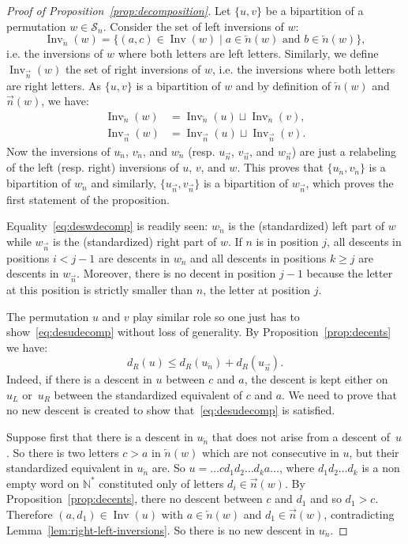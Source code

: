 \documentclass[ALCO,Unicode]{cedram}
\theoremstyle{definition}
\newcommand{\Sym}[1]{\mathcal{S}_{#1}}
\newcommand{\Symn}{\Sym{n}}
\DeclareMathOperator{\invs}{Inv}
\newcommand{\R}{{\overrightarrow{n}}}
\newcommand{\LL}{{\overleftarrow{n}}}
\newcommand{\dd}{d_R}
\begin{document}
\begin{proof}[Proof of Proposition~\ref{prop:decomposition}]
Let $\lbrace u, v \rbrace$ be a bipartition of a permutation $w \in \Symn$. Consider the set of left inversions of $w$:
$$
\invs_\LL(w)= \lbrace (a,c) \in \invs(w)\mid a \in \LL(w) \text{ and } b \in \LL(w) \rbrace,
$$
i.e. the inversions of $w$ where both letters are left letters. Similarly, we define $\invs_\R(w)$ the set of right inversions of $w$, i.e. the inversions where both letters are right letters. As $\lbrace u, v \rbrace$ is a bipartition of $w$ and by definition of  $\LL(w)$ and $\R(w)$, we have:
\begin{align*}
\invs_\LL(w) &= \invs_\LL(u) \sqcup \invs_\LL(v), \\
\invs_\R(w) &= \invs_\R(u) \sqcup \invs_\R(v).
\end{align*}
Now the inversions of $u_\LL$, $v_\LL$, and $w_\LL$ (resp. $u_\R$, $v_\R$, and $w_\R$) are just a relabeling of the left (resp. right) inversions of $u$, $v$, and $w$. This proves that $\lbrace u_\LL, v_\LL \rbrace$ is a bipartition of $w_\LL$ and similarly, $\lbrace u_\R, v_\R \rbrace$ is a bipartition of $w_\R$, which proves the first statement of the proposition. 


Equality~\eqref{eq:deswdecomp} is readily seen: $w_\LL$ is the (standardized) left part of $w$ while $w_\R$ is the (standardized) right part of $w$. If $n$ is in position $j$, all descents in positions $i < j-1$ are descents in $w_\LL$ and all descents in positions $k \geq j$ are descents in $w_\R$. Moreover, there is no decent in position $j-1$ because the letter at this position is strictly smaller than $n$, the letter at position $j$.

The permutation $u$ and $v$ play similar role so one just has to show~\eqref{eq:desudecomp} without loss of generality. By Proposition~\ref{prop:decents} we have:
\begin{equation*}
\dd(u) \leq \dd(u_\LL) + \dd(u_\R).
\end{equation*} 
Indeed, if there is a descent in $u$ between $c$ and $a$, the descent is kept either on~$u_L$ or~$u_R$ between the standardized equivalent of $c$ and $a$. We need to prove that no new descent is created to show that~\eqref{eq:desudecomp} is satisfied. 

Suppose first that there is a descent in $u_\LL$ that does not arise from a descent of~$u$. So there is two letters $c > a$ in $\LL(w)$ which are not consecutive in $u$, but their standardized equivalent in $u_\LL$ are. So $u=\dots c d_1d_2\dots d_k a\dots$, where $d_1d_2\dots d_k$ is a non empty word on $\mathbb N^*$ constituted only of letters  $d_i\in\R(w)$. By Proposition~\ref{prop:decents}, there no descent between $c$ and $d_1$ and so $d_1 > c$. Therefore $(a,d_1)\in\invs(u)$ with $a\in \LL(w)$ and $d_1\in\R(w)$, contradicting  Lemma~\ref{lem:right-left-inversions}. So there is no new descent in $u_\LL$.


\end{proof}
\end{document}
